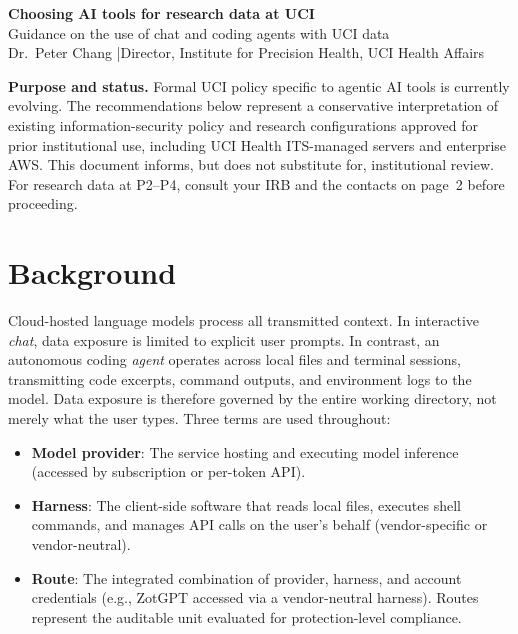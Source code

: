 \documentclass[10pt,letterpaper]{article}
\begin{document}
{\LARGE\bfseries\color{uciblue} Choosing AI tools for research data at UCI}\\[2pt]
{\large Guidance on the use of chat and coding agents with UCI data}\\[1pt]
{\small Dr.\ Peter Chang \quad|\quad Director, Institute for Precision Health, UCI Health Affairs}

\begin{tcolorbox}[colback=cond!50,colframe=cond!40!black,boxrule=0.5pt,left=4pt,right=4pt,top=2pt,bottom=2pt]
\small\textbf{Purpose and status.} Formal UCI policy specific to agentic AI tools is currently evolving. The recommendations below represent a conservative interpretation of existing information-security policy and research configurations approved for prior institutional use, including UCI Health ITS-managed servers and enterprise AWS. This document informs, but does not substitute for, institutional review. For research data at P2--P4, consult your IRB and the contacts on page~2 before proceeding.
\end{tcolorbox}

\section{Background}
Cloud-hosted language models process all transmitted context. In interactive \emph{chat}, data exposure is limited to explicit user prompts. In contrast, an autonomous coding \emph{agent} operates across local files and terminal sessions, transmitting code excerpts, command outputs, and environment logs to the model. Data exposure is therefore governed by the entire working directory, not merely what the user types. Three terms are used throughout:
\begin{itemize}
\item \textbf{Model provider}: The service hosting and executing model inference (accessed by subscription or per-token API).
\item \textbf{Harness}: The client-side software that reads local files, executes shell commands, and manages API calls on the user's behalf (vendor-specific or vendor-neutral).
\item \textbf{Route}: The integrated combination of provider, harness, and account credentials (e.g., ZotGPT accessed via a vendor-neutral harness). Routes represent the auditable unit evaluated for protection-level compliance.
\end{itemize}
\end{document}
